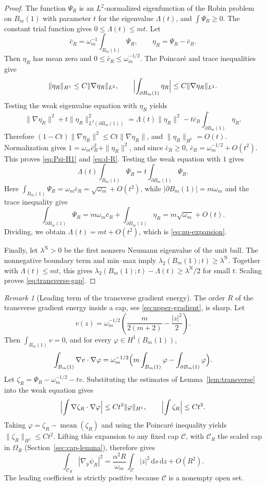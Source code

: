 \documentclass[11pt,a4paper]{article}
\numberwithin{equation}{section}
\theoremstyle{paperplain}
\theoremstyle{remark}
\newtheorem{remark}[theorem]{Remark}
\newcommand{\C}{\mathcal{C}}
\newcommand{\dd}{\,\mathrm d}
\begin{document}
\begin{proof}
The function $\Psi_R$ is an $L^2$-normalized eigenfunction of the Robin
problem on $B_m(1)$ with parameter $t$ for the eigenvalue $\Lambda(t)$, and
$\int\Psi_R\ge0$. The constant trial function gives $0\le\Lambda(t)\le mt$.
Let
\[
 \bar c_R=\omega_m^{-1}\int_{B_m(1)}\Psi_R,\qquad \eta_R=\Psi_R-\bar c_R.
\]
Then $\eta_R$ has mean zero and $0\le\bar c_R\le\omega_m^{-1/2}$. The
Poincar\'e and trace inequalities give
\[
 \|\eta_R\|_{H^1}\le C\|\nabla\eta_R\|_{L^2},\qquad
 \Bigl|\int_{\partial B_m(1)}\eta_R\Bigr|\le C\|\nabla\eta_R\|_{L^2}.
\]
Testing the weak eigenvalue equation with $\eta_R$ yields
\[
 \|\nabla\eta_R\|^2+t\|\eta_R\|_{L^2(\partial B_m(1))}^2
 =\Lambda(t)\|\eta_R\|^2-t\bar c_R\int_{\partial B_m(1)}\eta_R.
\]
Therefore $(1-Ct)\|\nabla\eta_R\|^2\le Ct\|\nabla\eta_R\|$, and
$\|\eta_R\|_{H^1}=O(t)$. Normalization gives
$1=\omega_m\bar c_R^2+\|\eta_R\|^2$, and since $\bar c_R\ge0$,
$\bar c_R=\omega_m^{-1/2}+O(t^2)$. This proves \eqref{eq:Psi-H1} and
\eqref{eq:d-R}. Testing the weak equation with $1$ gives
\[
 \Lambda(t)\int_{B_m(1)}\Psi_R=t\int_{\partial B_m(1)}\Psi_R.
\]
Here $\int_{B_m(1)}\Psi_R=\omega_m\bar c_R=\sqrt{\omega_m}+O(t^2)$, while
$|\partial B_m(1)|=m\omega_m$ and the trace inequality give
\[
 \int_{\partial B_m(1)}\Psi_R=m\omega_m\bar c_R+\int_{\partial B_m(1)}\eta_R
 =m\sqrt{\omega_m}+O(t).
\]
Dividing, we obtain $\Lambda(t)=mt+O(t^2)$, which is \eqref{eq:nu-expansion}.

Finally, let $\lambda^{\mathrm N}>0$ be the first nonzero Neumann
eigenvalue of the unit ball. The nonnegative boundary term and min--max
imply $\lambda_2(B_m(1);t)\ge\lambda^{\mathrm N}$. Together with
$\Lambda(t)\le mt$, this gives
$\lambda_2(B_m(1);t)-\Lambda(t)\ge\lambda^{\mathrm N}/2$ for small $t$. Scaling proves
\eqref{eq:transverse-gap}.
\end{proof}

\begin{remark}[Leading term of the transverse gradient energy]\label{rem:gradient-leading}
The order $R$ of the transverse gradient energy inside a cap, see
\eqref{eq:upper-gradient}, is sharp. Let
\[
 v(z)=\omega_m^{-1/2}\left(\frac{m}{2(m+2)}-\frac{|z|^2}{2}\right).
\]
Then $\int_{B_m(1)}v=0$, and for every $\varphi\in H^1(B_m(1))$,
\[
 \int_{B_m(1)}\nabla v\cdot\nabla\varphi
 =\omega_m^{-1/2}\Bigl(m\int_{B_m(1)}\varphi-\int_{\partial B_m(1)}\varphi\Bigr).
\]
Let $\zeta_R=\Psi_R-\omega_m^{-1/2}-tv$. Substituting the estimates of
Lemma~\ref{lem:transverse} into the weak equation gives
\[
 \Bigl|\int\nabla\zeta_R\cdot\nabla\varphi\Bigr|
 \le Ct^2\|\varphi\|_{H^1},\qquad
 \Bigl|\int\zeta_R\Bigr|\le Ct^2.
\]
Taking $\varphi=\zeta_R-\operatorname{mean}(\zeta_R)$ and using the Poincar\'e
inequality yields $\|\zeta_R\|_{H^1}\le Ct^2$. Lifting this expansion to any
fixed cap $\C$, with $\C_R$ the scaled cap in $\Omega_R$ (Section~\ref{sec:cap-lemma}),
therefore gives
\[
 \int_{\C_R}|\nabla_y\psi_R|^2
 =\frac{\alpha^2R}{\omega_m}\int_{\C}|z|^2\dd s\dd z+O(R^2).
\]
The leading coefficient is strictly positive because $\C$ is a nonempty open
set.
\end{remark}
\end{document}
